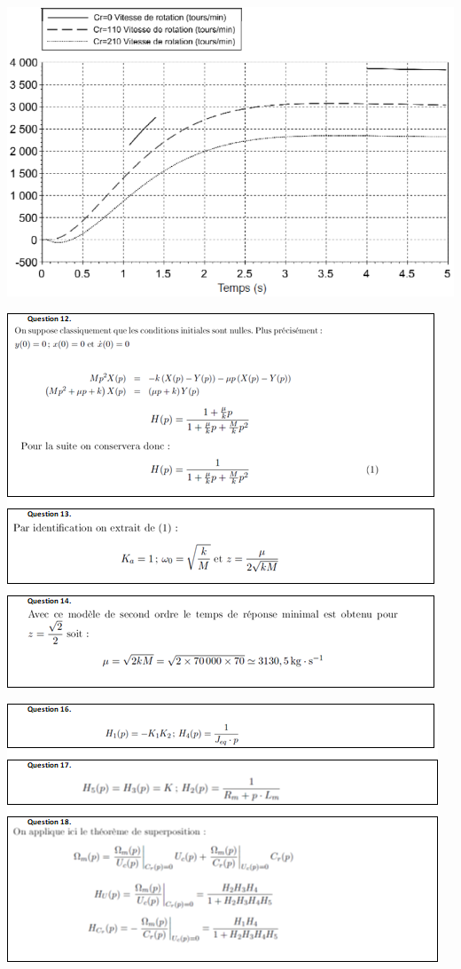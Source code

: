 \documentclass[10pt,fleqn]{article} %
\begin{document}
\begin{center}
	\includegraphics[width=16cm]{images/dr_01}
\end{center}

\newpage


\begin{center}
	\includegraphics[width=.9\linewidth]{images/cor_01}
\end{center}

\begin{center}
	\includegraphics[width=.9\linewidth]{images/cor_02}
\end{center}
\end{document}
